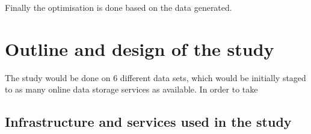 \documentclass[smallcondensed]{svjour3}     %
\begin{document}
Finally the optimisation is done based on the data generated.
\subsection{}


\section{Outline and design of the study}
\label{sec:outline}
The study would be done on 6 different data sets, which would be initially staged to as many online data storage services as available. In order to take

\subsection{Infrastructure and services used in the study}
\label{subsec:InfraServices}





\end{document}
